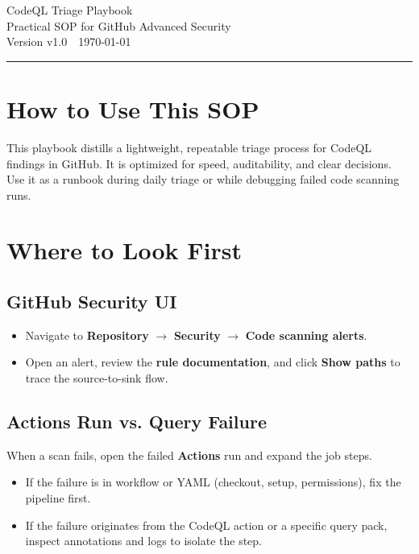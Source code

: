\documentclass[11pt,letterpaper]{article}
\newcommand{\product}{CodeQL}
\newcommand{\docTitle}{CodeQL Triage Playbook}
\newcommand{\docVersion}{v1.0}
\newcommand{\docDate}{\today}
\begin{document}
\begin{center}
  {\LARGE \docTitle}\\[4pt]
  {\large Practical SOP for GitHub Advanced Security}\\[6pt]
  {\small Version \docVersion\ \textbullet\ \docDate}\\[10pt]
\end{center}

\vspace{1em}
\tableofcontents
\vspace{1em}
\hrule
\vspace{1em}

\section{How to Use This SOP}
This playbook distills a lightweight, repeatable triage process for \product{} findings in GitHub. It is optimized for speed, auditability, and clear decisions. Use it as a runbook during daily triage or while debugging failed code scanning runs.

\section{Where to Look First}
\subsection{GitHub Security UI}
\begin{itemize}
  \item Navigate to \textbf{Repository} $\rightarrow$ \textbf{Security} $\rightarrow$ \textbf{Code scanning alerts}.
  \item Open an alert, review the \textbf{rule documentation}, and click \textbf{Show paths} to trace the source-to-sink flow.
\end{itemize}

\subsection{Actions Run vs. Query Failure}
When a scan fails, open the failed \textbf{Actions} run and expand the job steps.
\begin{itemize}
  \item If the failure is in workflow or YAML (checkout, setup, permissions), fix the pipeline first.
  \item If the failure originates from the \product{} action or a specific query pack, inspect annotations and logs to isolate the step.
\end{itemize}
\end{document}
